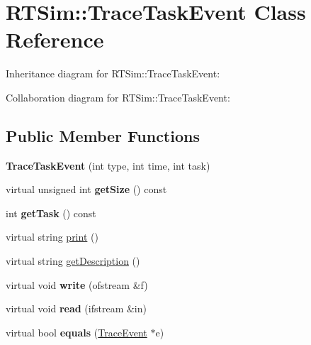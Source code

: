\hypertarget{classRTSim_1_1TraceTaskEvent}{}\section{R\+T\+Sim\+:\+:Trace\+Task\+Event Class Reference}
\label{classRTSim_1_1TraceTaskEvent}


Inheritance diagram for R\+T\+Sim\+:\+:Trace\+Task\+Event\+:


Collaboration diagram for R\+T\+Sim\+:\+:Trace\+Task\+Event\+:
\subsection*{Public Member Functions}
\begin{DoxyCompactItemize}
\item 
{\bfseries Trace\+Task\+Event} (int type, int time, int task)\hypertarget{classRTSim_1_1TraceTaskEvent_af70102a5704e5c18a368dd9af39015e5}{}\label{classRTSim_1_1TraceTaskEvent_af70102a5704e5c18a368dd9af39015e5}

\item 
virtual unsigned int {\bfseries get\+Size} () const \hypertarget{classRTSim_1_1TraceTaskEvent_aef7f511c6d47c7fa4f20bfa577248468}{}\label{classRTSim_1_1TraceTaskEvent_aef7f511c6d47c7fa4f20bfa577248468}

\item 
int {\bfseries get\+Task} () const \hypertarget{classRTSim_1_1TraceTaskEvent_a2b1fe5bc3f0d442744cc20c1613dbed2}{}\label{classRTSim_1_1TraceTaskEvent_a2b1fe5bc3f0d442744cc20c1613dbed2}

\item 
virtual string \hyperlink{classRTSim_1_1TraceTaskEvent_ac4b6e232c88506a951709d01e6fb5106}{print} ()
\item 
virtual string \hyperlink{classRTSim_1_1TraceTaskEvent_a0967a0d232d99305ef475b1f96536e89}{get\+Description} ()
\item 
virtual void {\bfseries write} (ofstream \&f)\hypertarget{classRTSim_1_1TraceTaskEvent_ad5d257fe30a91dfdaab1ae151cfca14f}{}\label{classRTSim_1_1TraceTaskEvent_ad5d257fe30a91dfdaab1ae151cfca14f}

\item 
virtual void {\bfseries read} (ifstream \&in)\hypertarget{classRTSim_1_1TraceTaskEvent_a647d6b5f050a86b8ef5fae26701d5c4d}{}\label{classRTSim_1_1TraceTaskEvent_a647d6b5f050a86b8ef5fae26701d5c4d}

\item 
virtual bool {\bfseries equals} (\hyperlink{classRTSim_1_1TraceEvent}{Trace\+Event} $\ast$e)\hypertarget{classRTSim_1_1TraceTaskEvent_a13374727617ca43b4652a0a8b68ec66b}{}\label{classRTSim_1_1TraceTaskEvent_a13374727617ca43b4652a0a8b68ec66b}

\end{DoxyCompactItemize}
